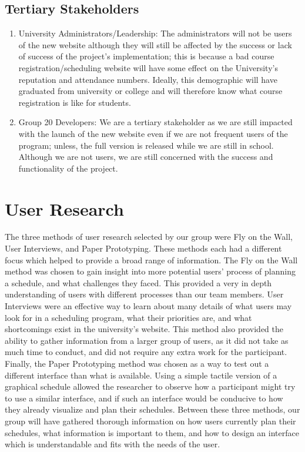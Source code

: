 \documentclass{article}
\begin{document}
\subsection{Tertiary Stakeholders}
\begin{enumerate}
    \item University Administrators/Leadership: The administrators will not be users of the new website although they will still be affected by the success or lack of success of the project's implementation; this is because a bad course registration/scheduling website will have some effect on the University's reputation and attendance numbers. Ideally, this demographic will have graduated from university or college and will therefore know what course registration is like for students.
    \item Group 20 Developers: We are a tertiary stakeholder as we are still impacted with the launch of the new website even if we are not frequent users of the program; unless, the full version is released while we are still in school. Although we are not users, we are still concerned with the success and functionality of the project.
\end{enumerate}

\section{User Research}
The three methods of user research selected by our group were Fly on the Wall, User Interviews, and Paper Prototyping. These methods each had a different focus which helped to provide a broad range of information. The Fly on the Wall method was chosen to gain insight into more potential users' process of planning a schedule, and what challenges they faced. This provided a very in depth understanding of users with different processes than our team members. User Interviews were an effective way to learn about many details of what users may look for in a scheduling program, what their priorities are, and what shortcomings exist in the university's website. This method also provided the ability to gather information from a larger group of users, as it did not take as much time to conduct, and did not require any extra work for the participant. Finally, the Paper Prototyping method was chosen as a way to test out a different interface than what is available. Using a simple tactile version of a graphical schedule allowed the researcher to observe how a participant might try to use a similar interface, and if such an interface would be conducive to how they already visualize and plan their schedules. Between these three methods, our group will have gathered thorough information on how users currently plan their schedules, what information is important to them, and how to design an interface which is understandable and fits with the needs of the user. 
\end{document}
